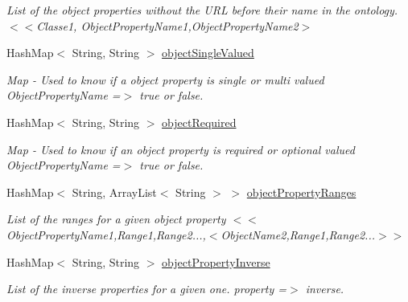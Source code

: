 \begin{DoxyCompactItemize}
\begin{DoxyCompactList}\small\item\em List of the object properties without the URL before their name in the ontology.  $<$$<$Classe1, ObjectPropertyName1,ObjectPropertyName2$>$ \end{DoxyCompactList}\item 
\hypertarget{class_ontology_1_1_object_property_ae17f30505dd7960fa544de3063ccdb10}{
HashMap$<$ String, String $>$ \hyperlink{class_ontology_1_1_object_property_ae17f30505dd7960fa544de3063ccdb10}{objectSingleValued}}
\label{class_ontology_1_1_object_property_ae17f30505dd7960fa544de3063ccdb10}

\begin{DoxyCompactList}\small\item\em Map -\/ Used to know if a object property is single or multi valued  ObjectPropertyName =$>$ true or false. \end{DoxyCompactList}\item 
\hypertarget{class_ontology_1_1_object_property_a1bb591de60f79ef7fc2f194c93dcff92}{
HashMap$<$ String, String $>$ \hyperlink{class_ontology_1_1_object_property_a1bb591de60f79ef7fc2f194c93dcff92}{objectRequired}}
\label{class_ontology_1_1_object_property_a1bb591de60f79ef7fc2f194c93dcff92}

\begin{DoxyCompactList}\small\item\em Map -\/ Used to know if an object property is required or optional valued  ObjectPropertyName =$>$ true or false. \end{DoxyCompactList}\item 
\hypertarget{class_ontology_1_1_object_property_a7e8b47c59b8d708d2ab5a02058a795f1}{
HashMap$<$ String, ArrayList$<$ String $>$ $>$ \hyperlink{class_ontology_1_1_object_property_a7e8b47c59b8d708d2ab5a02058a795f1}{objectPropertyRanges}}
\label{class_ontology_1_1_object_property_a7e8b47c59b8d708d2ab5a02058a795f1}

\begin{DoxyCompactList}\small\item\em List of the ranges for a given object property  $<$$<$ObjectPropertyName1,Range1,Range2...,$<$ObjectName2,Range1,Range2...$>$$>$ \end{DoxyCompactList}\item 
\hypertarget{class_ontology_1_1_object_property_a363cd9e611554fbad7c3efbc48621715}{
HashMap$<$ String, String $>$ \hyperlink{class_ontology_1_1_object_property_a363cd9e611554fbad7c3efbc48621715}{objectPropertyInverse}}
\label{class_ontology_1_1_object_property_a363cd9e611554fbad7c3efbc48621715}

\begin{DoxyCompactList}\small\item\em List of the inverse properties for a given one.  property =$>$ inverse. \end{DoxyCompactList}\end{DoxyCompactItemize}

